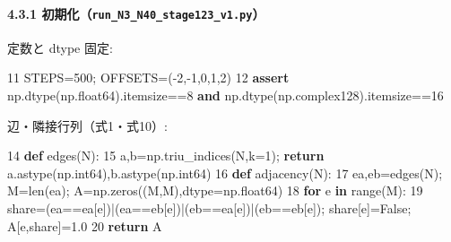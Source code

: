 \documentclass[
  a4paper,
]{ltjsarticle}
\newenvironment{Shaded}{}{}
\newcommand{\BuiltInTok}[1]{\textcolor[rgb]{0.00,0.50,0.00}{#1}}
\newcommand{\ControlFlowTok}[1]{\textcolor[rgb]{0.00,0.44,0.13}{\textbf{#1}}}
\newcommand{\DecValTok}[1]{\textcolor[rgb]{0.25,0.63,0.44}{#1}}
\newcommand{\FloatTok}[1]{\textcolor[rgb]{0.25,0.63,0.44}{#1}}
\newcommand{\KeywordTok}[1]{\textcolor[rgb]{0.00,0.44,0.13}{\textbf{#1}}}
\newcommand{\NormalTok}[1]{#1}
\newcommand{\OperatorTok}[1]{\textcolor[rgb]{0.40,0.40,0.40}{#1}}
\newcommand{\VariableTok}[1]{\textcolor[rgb]{0.10,0.09,0.49}{#1}}
\begin{document}
\paragraph{\texorpdfstring{4.3.1
初期化（\texttt{run\_N3\_N40\_stage123\_v1.py}）}{4.3.1 初期化（run\_N3\_N40\_stage123\_v1.py）}}\label{ux521dux671fux5316run_n3_n40_stage123_v1.py}

定数と dtype 固定:

\begin{Shaded}
\begin{Highlighting}[]
    \DecValTok{11}\NormalTok{  STEPS}\OperatorTok{=}\DecValTok{500}\OperatorTok{;}\NormalTok{ OFFSETS}\OperatorTok{=}\NormalTok{(}\OperatorTok{{-}}\DecValTok{2}\NormalTok{,}\OperatorTok{{-}}\DecValTok{1}\NormalTok{,}\DecValTok{0}\NormalTok{,}\DecValTok{1}\NormalTok{,}\DecValTok{2}\NormalTok{)}
    \DecValTok{12}  \ControlFlowTok{assert}\NormalTok{ np.dtype(np.float64).itemsize}\OperatorTok{==}\DecValTok{8} \KeywordTok{and}\NormalTok{ np.dtype(np.complex128).itemsize}\OperatorTok{==}\DecValTok{16}
\end{Highlighting}
\end{Shaded}

辺・隣接行列（式1・式10）:

\begin{Shaded}
\begin{Highlighting}[]
    \DecValTok{14}  \KeywordTok{def}\NormalTok{ edges(N):}
    \DecValTok{15}\NormalTok{      a,b}\OperatorTok{=}\NormalTok{np.triu\_indices(N,k}\OperatorTok{=}\DecValTok{1}\NormalTok{)}\OperatorTok{;} \ControlFlowTok{return}\NormalTok{ a.astype(np.int64),b.astype(np.int64)}
    \DecValTok{16}  \KeywordTok{def}\NormalTok{ adjacency(N):}
    \DecValTok{17}\NormalTok{      ea,eb}\OperatorTok{=}\NormalTok{edges(N)}\OperatorTok{;}\NormalTok{ M}\OperatorTok{=}\BuiltInTok{len}\NormalTok{(ea)}\OperatorTok{;}\NormalTok{ A}\OperatorTok{=}\NormalTok{np.zeros((M,M),dtype}\OperatorTok{=}\NormalTok{np.float64)}
    \DecValTok{18}      \ControlFlowTok{for}\NormalTok{ e }\KeywordTok{in} \BuiltInTok{range}\NormalTok{(M):}
    \DecValTok{19}\NormalTok{          share}\OperatorTok{=}\NormalTok{(ea}\OperatorTok{==}\NormalTok{ea[e])}\OperatorTok{|}\NormalTok{(ea}\OperatorTok{==}\NormalTok{eb[e])}\OperatorTok{|}\NormalTok{(eb}\OperatorTok{==}\NormalTok{ea[e])}\OperatorTok{|}\NormalTok{(eb}\OperatorTok{==}\NormalTok{eb[e])}\OperatorTok{;}\NormalTok{ share[e]}\OperatorTok{=}\VariableTok{False}\OperatorTok{;}\NormalTok{ A[e,share]}\OperatorTok{=}\FloatTok{1.0}
    \DecValTok{20}      \ControlFlowTok{return}\NormalTok{ A}
\end{Highlighting}
\end{Shaded}
\end{document}
